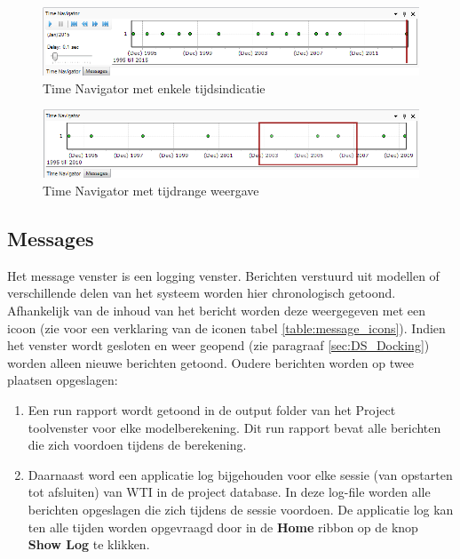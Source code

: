 \begin{figure}[H]
	\centering
		\includegraphics[width=\textwidth]{figures/chapter_general/TimeSeriesNavigator.png}
		\caption{Time Navigator met enkele tijdsindicatie}
	\label{fig:TimeSeriesNavigator}
\end{figure}
\begin{figure}[H]
	\centering
		\includegraphics[width=\textwidth]{figures/chapter_general/TimeSeriesNavigator_Range.png}
		\caption{Time Navigator met tijdrange weergave}
	\label{fig:TimeSeriesNavigator_Range}
\end{figure}

\subsection{Messages}
	\label{sec:DS_Messages}
Het message venster is een logging venster. Berichten verstuurd uit modellen of verschillende delen van het systeem worden hier chronologisch getoond. Afhankelijk van de inhoud van het bericht worden deze weergegeven met een icoon (zie voor een verklaring van de iconen tabel \ref{table:message_icons}). Indien het venster wordt gesloten en weer geopend (zie paragraaf \ref{sec:DS_Docking}) worden alleen nieuwe berichten getoond. Oudere berichten worden op twee plaatsen opgeslagen:
\begin{enumerate}
\item Een run rapport wordt getoond in de output folder van het Project toolvenster voor elke modelberekening. Dit run rapport bevat alle berichten die zich voordoen tijdens de berekening.
\item Daarnaast word een applicatie log bijgehouden voor elke sessie (van opstarten tot afsluiten) van WTI in de project database. In deze log-file worden alle berichten opgeslagen die zich tijdens de sessie voordoen. De applicatie log kan ten alle tijden worden opgevraagd door in de \textbf{Home} ribbon op de knop \textbf{Show Log} te klikken.
\end{enumerate}

